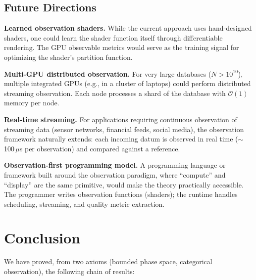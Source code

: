 \documentclass[11pt,twocolumn,a4paper]{article}
\newcommand{\BigO}{\mathcal{O}}
\begin{document}
\subsection{Future Directions}

\textbf{Learned observation shaders.} While the current approach uses
hand-designed shaders, one could learn the shader function itself
through differentiable rendering. The GPU observable metrics would
serve as the training signal for optimizing the shader's partition
function.

\textbf{Multi-GPU distributed observation.} For very large databases
($N > 10^{10}$), multiple integrated GPUs (e.g., in a cluster of
laptops) could perform distributed streaming observation. Each node
processes a shard of the database with $\BigO(1)$ memory per node.

\textbf{Real-time streaming.} For applications requiring continuous
observation of streaming data (sensor networks, financial feeds,
social media), the observation framework naturally extends: each
incoming datum is observed in real time ($\sim$100\,$\mu$s per
observation) and compared against a reference.

\textbf{Observation-first programming model.} A programming language
or framework built around the observation paradigm, where ``compute''
and ``display'' are the same primitive, would make the theory
practically accessible. The programmer writes observation functions
(shaders); the runtime handles scheduling, streaming, and quality
metric extraction.


\section{Conclusion}
\label{sec:conclusion}

We have proved, from two axioms (bounded phase space, categorical
observation), the following chain of results:
\end{document}
